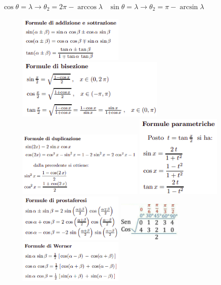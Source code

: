 \documentclass{article}
\begin{document}
$\cos \theta = \lambda \xrightarrow{} \theta_2 = 2\pi - \arccos{\lambda}$ \,
$\sin \theta = \lambda \xrightarrow{} \theta_2 = \pi - \arcsin{\lambda}$
\begin{figure}[!]
\includegraphics[width=5cm]{addizione.png}
\includegraphics[width=7cm]{bisezione.png}
\includegraphics[width=6cm]{duplicazione.png}
\includegraphics[width=4cm]{parametriche.png}
\includegraphics[width=5cm]{prostaferesi.png}
\includegraphics[width=3cm]{valori.jpg}
\includegraphics[width=5cm]{werner.png}

\end{figure}
\end{document}
